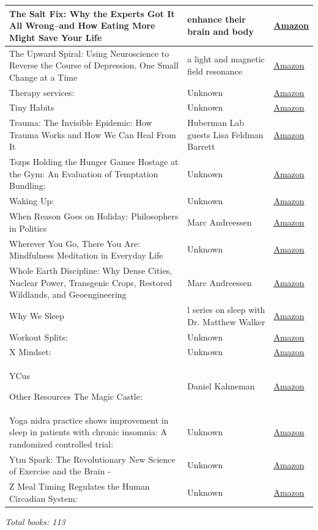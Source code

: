 \documentclass{article}
\begin{document}
\begin{longtable}{|p{8cm}|p{4cm}|p{2.5cm}|}
\hline
The Salt Fix: Why the Experts Got It All Wrong--and How Eating More Might Save Your Life & enhance their brain and body & \href{https://amzn.to/3CD1KHi}{Amazon} \\
\hline
The Upward Spiral: Using Neuroscience to Reverse the Course of Depression, One Small Change at a Time & a light and magnetic field resonance & \href{https://amzn.to/4acfs4t}{Amazon} \\
\hline
Therapy services: & Unknown & \href{https://amzn.to/4clZO7S}{Amazon} \\
\hline
Tiny Habits & Unknown & \href{https://amzn.to/39LDmZF}{Amazon} \\
\hline
Trauma: The Invisible Epidemic: How Trauma Works and How We Can Heal From It & Huberman Lab guests Lisa Feldman Barrett & \href{https://amzn.to/3GVLHXw}{Amazon} \\
\hline
Tszps
Holding the Hunger Games Hostage at the Gym: An Evaluation of Temptation Bundling: & Unknown & \href{https://amzn.to/3pZl4g6}{Amazon} \\
\hline
Waking Up: & Unknown & \href{https://amzn.to/4em00o9}{Amazon} \\
\hline
When Reason Goes on Holiday: Philosophers in Politics & Marc Andreessen & \href{https://amzn.to/45Xpt2i}{Amazon} \\
\hline
Wherever You Go, There You Are: Mindfulness Meditation in Everyday Life & Unknown & \href{https://amzn.to/3tus7PK}{Amazon} \\
\hline
Whole Earth Discipline: Why Dense Cities, Nuclear Power, Transgenic Crops, Restored Wildlands, and Geoengineering & Marc Andreessen & \href{https://amzn.to/3sAkQNr}{Amazon} \\
\hline
Why We Sleep & l series on sleep with Dr. Matthew Walker & \href{https://amzn.to/4a9Tyyl}{Amazon} \\
\hline
Workout Splits: & Unknown & \href{https://amzn.to/3P3Y2M9}{Amazon} \\
\hline
X
Mindset: & Unknown & \href{https://amzn.to/3vx35k8}{Amazon} \\
\hline
YCus

Other Resources
The Magic Castle: & Daniel Kahneman & \href{https://amzn.to/3Tzsph8}{Amazon} \\
\hline
Yoga nidra practice shows improvement in sleep in patients with chronic insomnia: A randomized controlled trial: & Unknown & \href{https://amzn.to/3TSnOFF}{Amazon} \\
\hline
Ytm
Spark: The Revolutionary New Science of Exercise and the Brain - & Unknown & \href{https://amzn.to/3AZFUgx}{Amazon} \\
\hline
Z
Meal Timing Regulates the Human Circadian System: & Unknown & \href{https://amzn.to/3zEvF0P}{Amazon} \\
\hline
\end{longtable}

\textit{Total books: 113}
\end{document}
